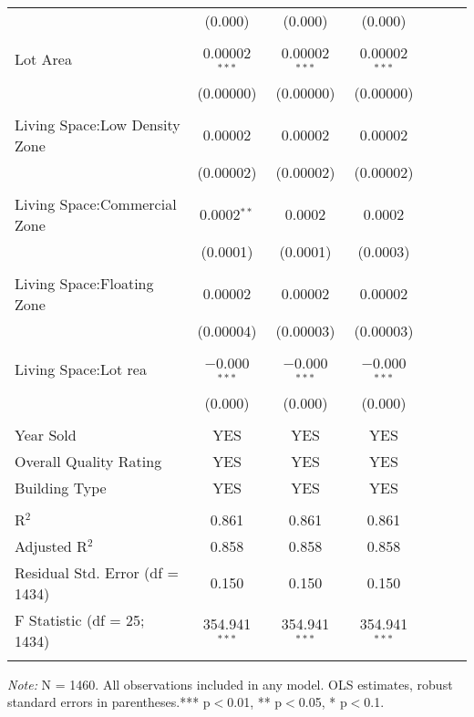 \documentclass[a4paper]{article}
\begin{document}
\begin{table}[!htbp]
\begin{adjustwidth}{0.5cm}{-0cm}
\begin{threeparttable}
\begin{tabular}{@{\extracolsep{-7pt}}lcccccc}
  & (0.000) & (0.000) & (0.000) \\ 
  & & & \\ 
 Lot Area & 0.00002$^{***}$ & 0.00002$^{***}$ & 0.00002$^{***}$ \\ 
  & (0.00000) & (0.00000) & (0.00000) \\ 
  & & & \\  
 Living Space:Low Density Zone & 0.00002 & 0.00002 & 0.00002 \\ 
  & (0.00002) & (0.00002) & (0.00002) \\ 
  & & & \\ 
 Living Space:Commercial Zone & 0.0002$^{**}$ & 0.0002 & 0.0002 \\ 
  & (0.0001) & (0.0001) & (0.0003) \\ 
  & & & \\ 
 Living Space:Floating Zone & 0.00002 & 0.00002 & 0.00002 \\ 
  & (0.00004) & (0.00003) & (0.00003) \\ 
  & & & \\ 
 Living Space:Lot rea & $-$0.000$^{***}$ & $-$0.000$^{***}$ & $-$0.000$^{***}$ \\ 
  & (0.000) & (0.000) & (0.000) \\ 
  & & & \\ 
  Year Sold & YES & YES & YES  \\ 
  Overall Quality Rating & YES & YES & YES  \\  
  Building Type & YES & YES & YES \\ 
\hline \\[-1.8ex] 

R$^{2}$ & 0.861 & 0.861 & 0.861 \\ 
Adjusted R$^{2}$ & 0.858 & 0.858 & 0.858 \\ 
Residual Std. Error (df = 1434) & 0.150 & 0.150 & 0.150 \\ 
F Statistic (df = 25; 1434) & 354.941$^{***}$ & 354.941$^{***}$ & 354.941$^{***}$ \\ 
\hline 
\hline \\[-3.5ex] 
\end{tabular} 
\begin{tablenotes}
      \small
      \item\textit{Note:} N = 1460. All observations included in any model. OLS estimates, robust standard errors in parentheses.*** p$<$0.01, ** p$<$0.05, * p$<$0.1. 
    \end{tablenotes}
\end{threeparttable}
\end{adjustwidth}
%
\end{table}
\end{document}
